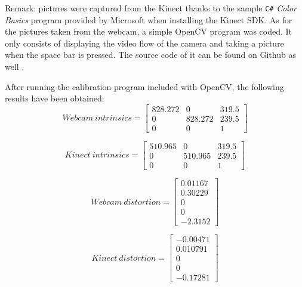 Remark: pictures were captured from the Kinect thanks to the sample \texttt{C\#} \textit{Color Basics} program provided by Microsoft when installing the Kinect SDK. As for the pictures taken from the webcam, a simple OpenCV program was coded. It only consists of displaying the video flow of the camera and taking a picture when the space bar is pressed. The source code of it can be found on Github as well \cite{github}.

After running the calibration program included with OpenCV, the following results have been obtained:\\

\begin{equation}
  Webcam\:intrinsics = \begin{bmatrix}
       828.272 & 0 & 319.5 \\
       0 & 828.272 & 239.5 \\
       0 & 0 & 1
     \end{bmatrix} 
\end{equation}

\begin{equation}
  Kinect\:intrinsics = \begin{bmatrix}
       510.965 & 0 & 319.5 \\
       0 & 510.965 & 239.5 \\
       0 & 0 & 1
     \end{bmatrix} 
\end{equation}

\begin{equation}
  Webcam\:distortion = \begin{bmatrix}
       0.01167 \\
       0.30229  \\
       0 \\
       0 \\
       -2.3152 
     \end{bmatrix} 
\end{equation}

\begin{equation}
  Kinect\:distortion = \begin{bmatrix}
       -0.00471 \\
       0.010791 \\
       0 \\
       0 \\
       -0.17281
     \end{bmatrix} 
\end{equation}

